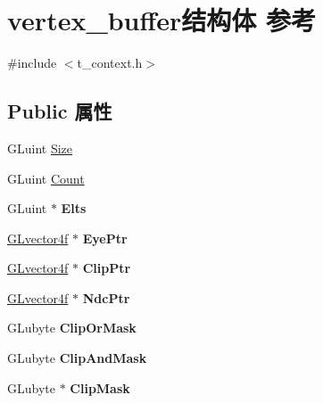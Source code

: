 \hypertarget{structvertex__buffer}{}\section{vertex\+\_\+buffer结构体 参考}
\label{structvertex__buffer}


{\ttfamily \#include $<$t\+\_\+context.\+h$>$}

\subsection*{Public 属性}
\begin{DoxyCompactItemize}
\item 
G\+Luint \hyperlink{structvertex__buffer_a0effd747a55027c36761aa6bbf104696}{Size}
\item 
G\+Luint \hyperlink{structvertex__buffer_a57863134e7679f774853f5226e2489ae}{Count}
\item 
\mbox{\label{structvertex__buffer_ab344e72d47068a93979c085c4a628f86}} 
G\+Luint $\ast$ {\bfseries Elts}
\item 
\mbox{\label{structvertex__buffer_aa3d51b76c5f9779a7fe5744ceb06be7a}} 
\hyperlink{struct_g_lvector4f}{G\+Lvector4f} $\ast$ {\bfseries Eye\+Ptr}
\item 
\mbox{\label{structvertex__buffer_ac8971de7c58966b4ea88e14f4ffda61c}} 
\hyperlink{struct_g_lvector4f}{G\+Lvector4f} $\ast$ {\bfseries Clip\+Ptr}
\item 
\mbox{\label{structvertex__buffer_a386513e1b4bd59d297054df5f9c0039e}} 
\hyperlink{struct_g_lvector4f}{G\+Lvector4f} $\ast$ {\bfseries Ndc\+Ptr}
\item 
\mbox{\label{structvertex__buffer_ac1a30bac50c586adcda0a54b2979e612}} 
G\+Lubyte {\bfseries Clip\+Or\+Mask}
\item 
\mbox{\label{structvertex__buffer_a5dab759f5fb2559abe6827462ab12079}} 
G\+Lubyte {\bfseries Clip\+And\+Mask}
\item 
\mbox{\label{structvertex__buffer_a8aa61b6b419fc37996f7d202260b32fe}} 
G\+Lubyte $\ast$ {\bfseries Clip\+Mask}

\end{DoxyCompactItemize}
